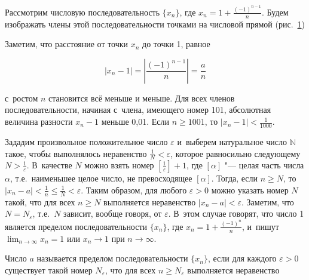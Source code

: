 
Рассмотрим числовую последовательность $\{x_{n}\}$,
где $\displaystyle x_{n} = 1 + \frac{(-1)^{n-1}}{n}$.
Будем изображать члены этой последовательности точками на числовой прямой (рис.\ \ref{fig:3_1_3_1})

\begin{figure}\label{fig:3_1_3_1}
\end{figure}

\noindent
Заметим, что расстояние от точки $x_{n}$ до точки 1, равное

\begin{equation*}
\displaystyle |x_{n} - 1| = \left| \frac{(-1)^{n-1}}{n}\right| = \frac{a}{n}
\end{equation*}

\noindent
с~ростом $n$ становится всё меньше и меньше.
Для всех членов последовательности, начиная с~члена, имеющего номер 101,
абсолютная величина разности $x_{n} - 1$ меньше 0,01.
Если $n \geqslant 1001$, то $\displaystyle |x_{n} - 1| < \frac{1}{1000}$.

Зададим произвольное положительное число $\varepsilon$ и~выберем натуральное число
$\mathbb{N}$ такое, чтобы выполнялось неравенство $\displaystyle \frac{1}{N} < \varepsilon$,
которое равносильно следующему $\displaystyle  N > \frac{1}{\varepsilon}$.
В~качестве $N$ можно взять номер $\displaystyle \left[ \frac{1}{\varepsilon} \right] + 1$,
где $[\alpha]$ "--- целая часть числа $\alpha$, т.е.\ наименьшее целое число,
не превосходящее $[\alpha]$. Тогда, если $n \geqslant N$, то
$\displaystyle |x_{n} - a| < \frac{1}{n} \leqslant \frac{1}{N} < \varepsilon$.
Таким образом, для любого $\varepsilon > 0$ можно указать номер $N$ такой,
что для всех $n \geqslant N$ выполняется неравенство $|x_{n} - a| < \varepsilon$.
Заметим, что $N = N_{\varepsilon}$, т.е.\ $N$ зависит, вообще говоря, от $\varepsilon$.
В~этом случае говорят, что число 1 является пределом последовательности $\{x_{n}\}$,
где $\displaystyle x_{n} = 1 + \frac{(-1)^{n}}{n}$,
и~пишут $\displaystyle \lim_{n \to \infty} x_{n} = 1$ или $x_{n} \to 1$ при $n \to \infty$.

\begin{Def} Число $a$ называется пределом последовательности $\{x_{n}\}$,
если для каждого $\varepsilon > 0$ существует такой номер $N_{\varepsilon}$,
что для всех $n \geqslant N_{\varepsilon}$ выполняется неравенство
\end{Def}


